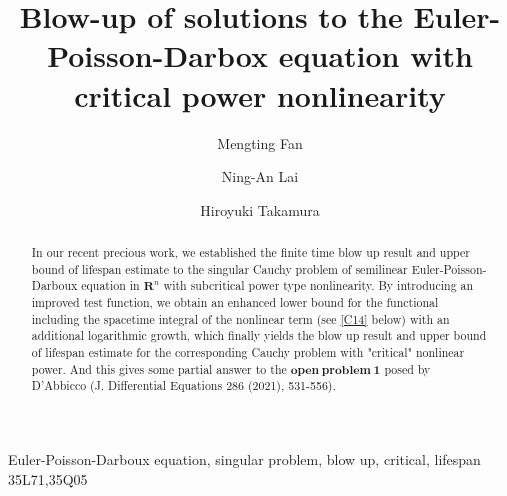 \documentclass[review]{elsarticle}
\newcommand{\R}{\mathbf{R}}
\begin{document}
\begin{frontmatter}

\title{Blow-up of solutions to the Euler-Poisson-Darbox equation with
critical power nonlinearity}





\author[secondaryaddress]{Mengting Fan}


\author[secondaryaddress]{Ning-An Lai}







\author[thirdaddress]{Hiroyuki Takamura}

\address[secondaryaddress]{School of Mathematical Sciences, Zhejiang Normal University, Jinhua 321004, China}

\address[thirdaddress]{Mathematical Institute, Tohoku University, Aoba, Sendai 980-8578, Japan}





\begin{abstract}

In our recent precious work, we established the finite time blow up result and upper bound of lifespan estimate to the singular Cauchy problem of semilinear Euler-Poisson-Darboux equation in $\R^n$ with subcritical power type nonlinearity.
By introducing an improved test function, we obtain an enhanced lower bound for the functional including the spacetime integral of the nonlinear term (see \eqref{C14} below) with an additional logarithmic growth, which finally yields the blow up result and upper bound of lifespan estimate for the corresponding Cauchy problem with "critical" nonlinear power. And this gives some partial answer to the $\mathbf{open~ problem ~1}$ posed by D'Abbicco (J. Differential Equations 286 (2021), 531-556).



\end{abstract}

\begin{keyword}
Euler-Poisson-Darboux equation, singular problem, blow up, critical, lifespan
\MSC 35L71\sep 35Q05
\end{keyword}

\end{frontmatter}
\end{document}
